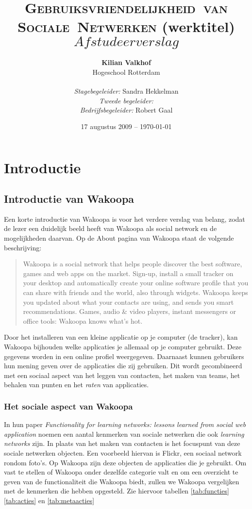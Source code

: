 \documentclass[a4paper, 10pt, pdftex]{article}
\title{\textsc{Gebruiksvriendelijkheid~van Sociale~Netwerken} \linebreak (werktitel) \linebreak $Afstudeerverslag$}
\author{\textbf{Kilian Valkhof}\\
  Hogeschool Rotterdam\\
  \\
  \textit{Stagebegeleider:} Sandra Hekkelman\\
  \textit{Tweede begeleider:}\\
  \textit{Bedrijfsbegeleider:} Robert Gaal}
\date{17 augustus 2009 -- \today}
\begin{document}
  \normalem
  \maketitle

  \newpage
  \tableofcontents

  \newpage
  \section{Introductie}
    \subsection{Introductie van Wakoopa}
      Een korte introductie van Wakoopa is voor het verdere verslag van belang, zodat de lezer een duidelijk beeld heeft van Wakoopa als social network en de mogelijkheden daarvan. Op de About pagina van Wakoopa \citep{Gaal2007} staat de volgende beschrijving:
        \begin{quote} Wakoopa is a social network that helps people discover the best software, games and web apps on the market. Sign-up, install a small tracker on your desktop and automatically create your online software profile that you can share with friends and the world, also through widgets. Wakoopa keeps you updated about what your contacts are using, and sends you smart recommendations. Games, audio \& video players, instant messengers or office tools: Wakoopa knows what's hot.
        \end{quote}
      Door het installeren van een kleine applicatie op je computer (de tracker), kan Wakoopa bijhouden welke applicaties je allemaal op je computer gebruikt. Deze gegevens worden in een online profiel weergegeven. Daarnaast kunnen gebruikers hun mening geven over de applicaties die zij gebruiken. Dit wordt gecombineerd met een sociaal aspect van het leggen van contacten, het maken van teams, het behalen van punten en het \emph{raten} van applicaties.

        \subsubsection{Het sociale aspect van Wakoopa}
        In hun paper \emph{Functionality for learning networks: lessons learned from social web application} noemen \citeauthor*{Berlanga2007} een aantal kenmerken van sociale netwerken die ook \emph{learning networks} zijn. In plaats van het maken van contacten is het focuspunt van deze sociale netwerken objecten. Een voorbeeld hiervan is Flickr, een sociaal network rondom foto's. Op Wakoopa zijn deze objecten de applicaties die je gebruikt. Om vast te stellen of Wakoopa onder dezelfde categorie valt en om een overzicht te geven van de functionaliteit die Wakoopa biedt, zullen we Wakoopa vergelijken met de kenmerken die \citeauthor{Berlanga2007} hebben opgesteld. Zie hiervoor tabellen \ref{tab:functies} \ref{tab:acties} en \ref{tab:metaacties}
\end{document}
